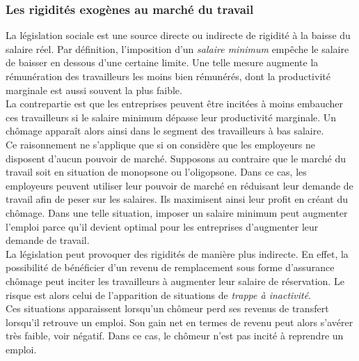 \documentclass[10pt]{book}
\begin{document}
\subsubsection{Les rigidités exogènes au marché du travail}
La législation sociale est une source directe ou indirecte de rigidité à la baisse du salaire réel. Par définition, l'imposition d'un \textit{salaire minimum} empêche le salaire de baisser en dessous d'une certaine limite. Une telle mesure augmente la rémunération des travailleurs les moins bien rémunérés, dont la productivité marginale est aussi souvent la plus faible.\\
La contrepartie est que les entreprises peuvent être incitées à moins embaucher ces travailleurs si le salaire minimum dépasse leur productivité marginale. Un chômage apparaît alors ainsi dans le segment des travailleurs à bas salaire. \\
Ce raisonnement ne s'applique que si on considère que les employeurs ne disposent d'aucun pouvoir de marché. Supposons au contraire que le marché du travail soit en situation de monopsone ou l'oligopsone. Dans ce cas, les employeurs peuvent utiliser leur pouvoir de marché en réduisant leur demande de travail afin de peser sur les salaires. Ils maximisent ainsi leur profit en créant du chômage. Dans une telle situation, imposer un salaire minimum peut augmenter l'emploi parce qu'il devient optimal pour les entreprises d'augmenter leur demande de travail. \\
La législation peut provoquer des rigidités de manière plus indirecte. En effet, la possibilité de bénéficier d'un revenu de remplacement sous forme d'assurance chômage peut inciter les travailleurs à augmenter leur salaire de réservation. Le risque est alors celui de l'apparition de situations de \textit{trappe à inactivité}. \\
Ces situations apparaissent lorsqu'un chômeur perd ses revenus de transfert lorsqu'il retrouve un emploi. Son gain net en termes de revenu peut alors s'avérer très faible, voir négatif. Dans ce cas, le chômeur n'est pas incité à reprendre un emploi.
\end{document}
